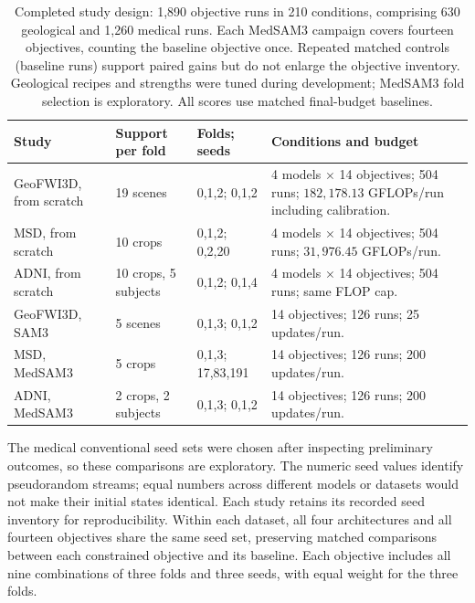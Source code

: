 \begin{table}[htbp]
\centering\small{}
\begin{tabular}{@{}P{2.5cm}P{3.0cm}P{3.2cm}P{5.7cm}@{}}
\hline
Study & Support per fold & Folds; seeds & Conditions and budget \\
\hline
GeoFWI3D, from scratch & 19 scenes & 0,1,2; 0,1,2 & 4 models $\times$ 14 objectives; 504 runs; $182{,}178.13$ GFLOPs/run including calibration. \\[.5em]
MSD, from scratch & 10 crops & 0,1,2; 0,2,20 & 4 models $\times$ 14 objectives; 504 runs; $31{,}976.45$ GFLOPs/run. \\[.5em]
ADNI, from scratch & 10 crops, 5 subjects & 0,1,2; 0,1,4 & 4 models $\times$ 14 objectives; 504 runs; same FLOP cap. \\[.5em]
GeoFWI3D, SAM3 & 5 scenes & 0,1,3; 0,1,2 & 14 objectives; 126 runs; 25 updates/run. \\[.5em]
MSD, MedSAM3 & 5 crops & 0,1,3; 17,83,191 & 14 objectives; 126 runs; 200 updates/run. \\[.5em]
ADNI, MedSAM3 & 2 crops, 2 subjects & 0,1,3; 0,1,2 & 14 objectives; 126 runs; 200 updates/run. \\
\hline
\end{tabular}
\caption{Completed study design: 1,890 objective runs in 210 conditions,
comprising 630 geological and 1,260 medical runs.
Each MedSAM3 campaign covers fourteen objectives, counting the baseline
objective once. Repeated matched controls (baseline runs) support paired gains but do
not enlarge the objective inventory.
Geological recipes and strengths were tuned during development;
MedSAM3 fold selection is exploratory.
All scores use matched final-budget baselines.}
\label{tab:experimental-design}
\end{table}

The medical conventional seed sets were chosen after inspecting
preliminary outcomes, so these comparisons are exploratory.
The numeric seed values identify pseudorandom streams; equal numbers
across different models or datasets would not make their initial states
identical. Each study retains its recorded seed inventory for reproducibility.
Within each dataset, all four architectures and all fourteen objectives
share the same seed set,
preserving matched comparisons between each constrained objective and
its baseline. Each objective includes all nine combinations of three
folds and three seeds, with equal weight for the three folds.

